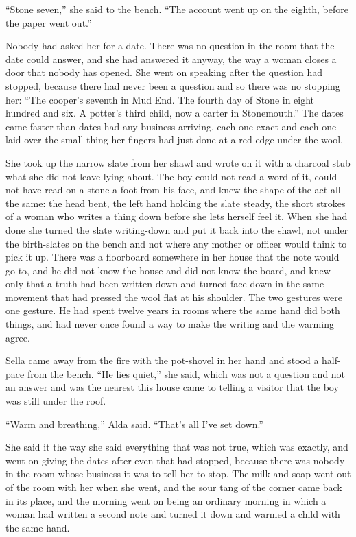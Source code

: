 “Stone seven,” she said to the bench. “The account went up on the eighth, before the paper went out.”

Nobody had asked her for a date. There was no question in the room that the date could answer, and she had answered it anyway, the way a woman closes a door that nobody has opened. She went on speaking after the question had stopped, because there had never been a question and so there was no stopping her: “The cooper's seventh in Mud End. The fourth day of Stone in eight hundred and six. A potter's third child, now a carter in Stonemouth.” The dates came faster than dates had any business arriving, each one exact and each one laid over the small thing her fingers had just done at a red edge under the wool.

She took up the narrow slate from her shawl and wrote on it with a charcoal stub what she did not leave lying about. The boy could not read a word of it, could not have read  on a stone a foot from his face, and knew the shape of the act all the same: the head bent, the left hand holding the slate steady, the short strokes of a woman who writes a thing down before she lets herself feel it. When she had done she turned the slate writing-down and put it back into the shawl, not under the birth-slates on the bench and not where any mother or officer would think to pick it up. There was a floorboard somewhere in her house that the note would go to, and he did not know the house and did not know the board, and knew only that a truth had been written down and turned face-down in the same movement that had pressed the wool flat at his shoulder. The two gestures were one gesture. He had spent twelve years in rooms where the same hand did both things, and had never once found a way to make the writing and the warming agree.

Sella came away from the fire with the pot-shovel in her hand and stood a half-pace from the bench. “He lies quiet,” she said, which was not a question and not an answer and was the nearest this house came to telling a visitor that the boy was still under the roof.

“Warm and breathing,” Alda said. “That's all I've set down.”

She said it the way she said everything that was not true, which was exactly, and went on giving the dates after even that had stopped, because there was nobody in the room whose business it was to tell her to stop. The milk and soap went out of the room with her when she went, and the sour tang of the corner came back in its place, and the morning went on being an ordinary morning in which a woman had written a second note and turned it down and warmed a child with the same hand.

